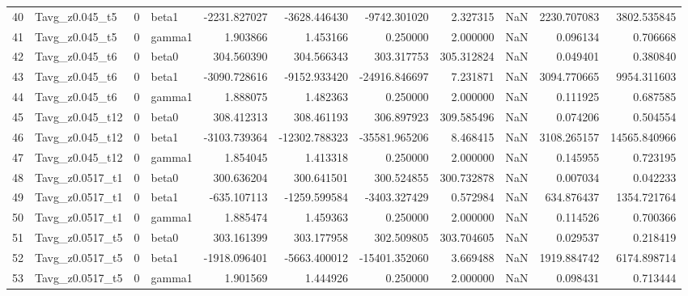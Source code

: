 \begin{tabular}{llrlrrrrrrr}
40 &    Tavg_z0.045_t5 &       0 &     beta1 &  -2231.827027 &  -3628.446430 &  -9742.301020 &     2.327315 &      NaN &   2230.707083 &   3802.535845 \\
41 &    Tavg_z0.045_t5 &       0 &    gamma1 &      1.903866 &      1.453166 &      0.250000 &     2.000000 &      NaN &      0.096134 &      0.706668 \\
42 &    Tavg_z0.045_t6 &       0 &     beta0 &    304.560390 &    304.566343 &    303.317753 &   305.312824 &      NaN &      0.049401 &      0.380840 \\
43 &    Tavg_z0.045_t6 &       0 &     beta1 &  -3090.728616 &  -9152.933420 & -24916.846697 &     7.231871 &      NaN &   3094.770665 &   9954.311603 \\
44 &    Tavg_z0.045_t6 &       0 &    gamma1 &      1.888075 &      1.482363 &      0.250000 &     2.000000 &      NaN &      0.111925 &      0.687585 \\
45 &   Tavg_z0.045_t12 &       0 &     beta0 &    308.412313 &    308.461193 &    306.897923 &   309.585496 &      NaN &      0.074206 &      0.504554 \\
46 &   Tavg_z0.045_t12 &       0 &     beta1 &  -3103.739364 & -12302.788323 & -35581.965206 &     8.468415 &      NaN &   3108.265157 &  14565.840966 \\
47 &   Tavg_z0.045_t12 &       0 &    gamma1 &      1.854045 &      1.413318 &      0.250000 &     2.000000 &      NaN &      0.145955 &      0.723195 \\
48 &   Tavg_z0.0517_t1 &       0 &     beta0 &    300.636204 &    300.641501 &    300.524855 &   300.732878 &      NaN &      0.007034 &      0.042233 \\
49 &   Tavg_z0.0517_t1 &       0 &     beta1 &   -635.107113 &  -1259.599584 &  -3403.327429 &     0.572984 &      NaN &    634.876437 &   1354.721764 \\
50 &   Tavg_z0.0517_t1 &       0 &    gamma1 &      1.885474 &      1.459363 &      0.250000 &     2.000000 &      NaN &      0.114526 &      0.700366 \\
51 &   Tavg_z0.0517_t5 &       0 &     beta0 &    303.161399 &    303.177958 &    302.509805 &   303.704605 &      NaN &      0.029537 &      0.218419 \\
52 &   Tavg_z0.0517_t5 &       0 &     beta1 &  -1918.096401 &  -5663.400012 & -15401.352060 &     3.669488 &      NaN &   1919.884742 &   6174.898714 \\
53 &   Tavg_z0.0517_t5 &       0 &    gamma1 &      1.901569 &      1.444926 &      0.250000 &     2.000000 &      NaN &      0.098431 &      0.713444 \\

\end{tabular}
